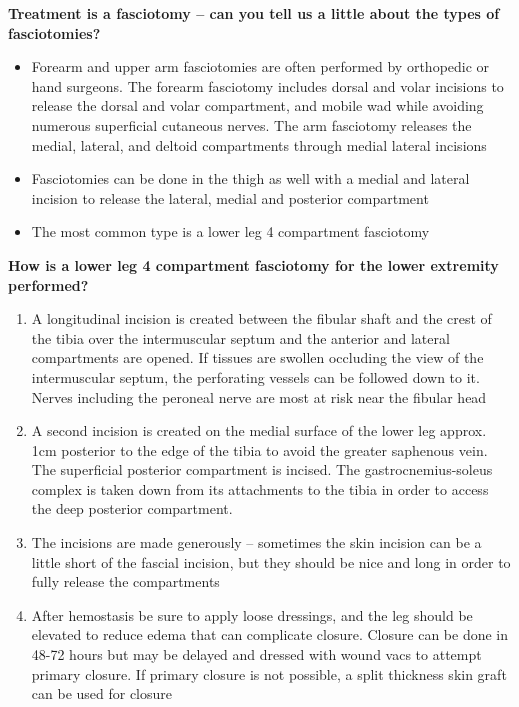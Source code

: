 \documentclass[
]{book}
\begin{document}
\textbf{Treatment is a fasciotomy -- can you tell us a little about the types
of fasciotomies?}

\begin{itemize}
\item
  Forearm and upper arm fasciotomies are often performed by orthopedic
  or hand surgeons. The forearm fasciotomy includes dorsal and volar
  incisions to release the dorsal and volar compartment, and mobile
  wad while avoiding numerous superficial cutaneous nerves. The arm
  fasciotomy releases the medial, lateral, and deltoid compartments
  through medial lateral incisions~
\item
  Fasciotomies can be done in the thigh as well with a medial and
  lateral incision to release the lateral, medial and posterior
  compartment
\item
  The most common type is a lower leg 4 compartment fasciotomy~
\end{itemize}

\textbf{How is a lower leg 4 compartment fasciotomy for the lower extremity
performed?}

\begin{enumerate}
\def\labelenumi{\arabic{enumi}.}
\item
  A longitudinal incision is created between the fibular shaft and the
  crest of the tibia over the intermuscular septum and the anterior
  and lateral compartments are opened. If tissues are swollen
  occluding the view of the intermuscular septum, the perforating
  vessels can be followed down to it. Nerves including the peroneal
  nerve are most at risk near the fibular head
\item
  A second incision is created on the medial surface of the lower leg
  approx. 1cm posterior to the edge of the tibia to avoid the greater
  saphenous vein. The superficial posterior compartment is incised.
  The gastrocnemius-soleus complex is taken down from its attachments
  to the tibia in order to access the deep posterior compartment.~
\item
  The incisions are made generously -- sometimes the skin incision can
  be a little short of the fascial incision, but they should be nice
  and long in order to fully release the compartments
\item
  After hemostasis be sure to apply loose dressings, and the leg
  should be elevated to reduce edema that can complicate closure.
  Closure can be done in 48-72 hours but may be delayed and dressed
  with wound vacs to attempt primary closure. If primary closure is
  not possible, a split thickness skin graft can be used for closure~
\end{enumerate}
\end{document}
